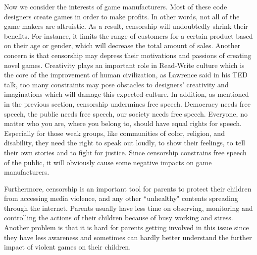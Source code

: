 Now we consider the interests of game manufacturers. Most of these code designers create games in order to make profits. In other words, not all of the game makers are altruistic.  As a result, censorship will undoubtedly shrink their benefits. For instance, it limits the range of customers for a certain product based on their age or gender, which will decrease the total amount of sales. Another concern is that censorship may depress their motivations and passions of creating novel games. Creativity plays an important role in Read-Write culture which is the core of the improvement of human civilization, as Lawrence said in his TED talk, too many constraints may pose obstacles to designers' creativity and imaginations which will damage this expected culture. In addition, as mentioned in the previous section, censorship undermines free speech. Democracy needs free speech, the public needs free speech, our society needs free speech. Everyone, no matter who you are, where you belong to, should have equal rights for speech. Especially for those weak groups, like communities of color, religion, and disability, they need the right to speak out loudly, to show their feelings, to tell their own stories and to fight for justice. Since censorship constrains free speech of the public, it will obviously cause some negative impacts on game manufacturers.

Furthermore, censorship is an important tool for parents to protect their children from accessing media violence, and any other ``unhealthy" contents spreading through the internet. Parents usually have less time on observing, monitoring and controlling the actions of their children because of busy working and stress. Another problem is that it is hard for parents getting involved in this issue since they have less awareness and sometimes can hardly better understand the further impact of violent games on their children.

